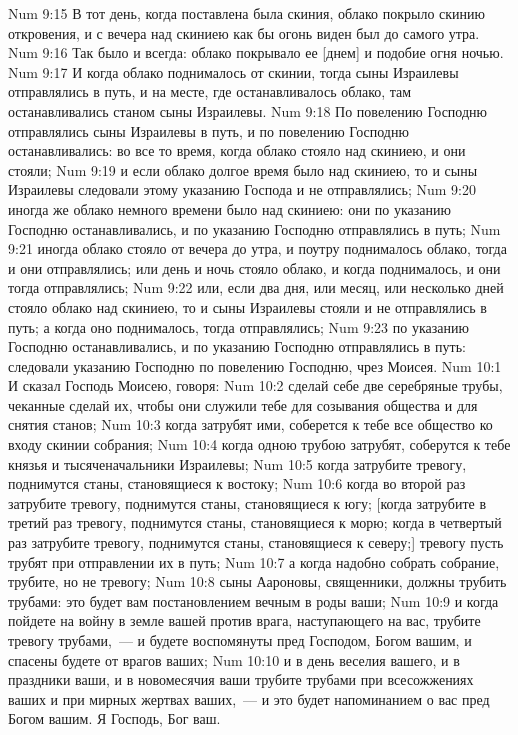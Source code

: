 \rsbpar\vs Num 9:15 В тот день, когда поставлена была скиния, облако покрыло скинию откровения, и с вечера над скиниею как бы огонь виден был до самого утра.
\vs Num 9:16 Так было и всегда: облако покрывало ее [днем] и подобие огня ночью.
\vs Num 9:17 И когда облако поднималось от скинии, тогда сыны Израилевы отправлялись в путь, и на месте, где останавливалось облако, там останавливались станом сыны Израилевы.
\vs Num 9:18 По повелению Господню отправлялись сыны Израилевы в путь, и по повелению Господню останавливались: во все то время, когда облако стояло над скиниею, и они стояли;
\vs Num 9:19 и если облако долгое время было над скиниею, то и сыны Израилевы следовали этому указанию Господа и не отправлялись;
\vs Num 9:20 иногда же облако немного времени было над скиниею: они по указанию Господню останавливались, и по указанию Господню отправлялись в путь;
\vs Num 9:21 иногда облако стояло  от вечера до утра, и поутру поднималось облако, тогда и они отправлялись; или день и ночь стояло облако, и когда поднималось, и они тогда отправлялись;
\vs Num 9:22 или, если два дня, или месяц, или несколько дней стояло облако над скиниею, то и сыны Израилевы стояли и не отправлялись в путь; а когда оно поднималось, тогда отправлялись;
\vs Num 9:23 по указанию Господню останавливались, и по указанию Господню отправлялись в путь: следовали указанию Господню по повелению Господню,  чрез Моисея.
\vs Num 10:1 И сказал Господь Моисею, говоря:
\vs Num 10:2 сделай себе две серебряные трубы, чеканные сделай их, чтобы они служили тебе для созывания общества и для снятия станов;
\vs Num 10:3 когда затрубят ими, соберется к тебе все общество ко входу скинии собрания;
\vs Num 10:4 когда одною трубою затрубят, соберутся к тебе князья и тысяченачальники Израилевы;
\vs Num 10:5 когда затрубите тревогу, поднимутся станы, становящиеся к востоку;
\vs Num 10:6 когда во второй раз затрубите тревогу, поднимутся станы, становящиеся к югу; [когда затрубите в третий раз тревогу, поднимутся станы, становящиеся к морю; когда в четвертый раз затрубите тревогу, поднимутся станы, становящиеся к северу;] тревогу пусть трубят при отправлении их в путь;
\vs Num 10:7 а когда надобно собрать собрание, трубите, но не тревогу;
\vs Num 10:8 сыны Аароновы, священники, должны трубить трубами: это будет вам постановлением вечным в роды ваши;
\vs Num 10:9 и когда пойдете на войну в земле вашей против врага, наступающего на вас, трубите тревогу трубами,~--- и будете воспомянуты пред Господом, Богом вашим, и спасены будете от врагов ваших;
\vs Num 10:10 и в день веселия вашего, и в праздники ваши, и в новомесячия ваши трубите трубами при всесожжениях ваших и при мирных жертвах ваших,~--- и это будет напоминанием о вас пред Богом вашим. Я Господь, Бог ваш.
